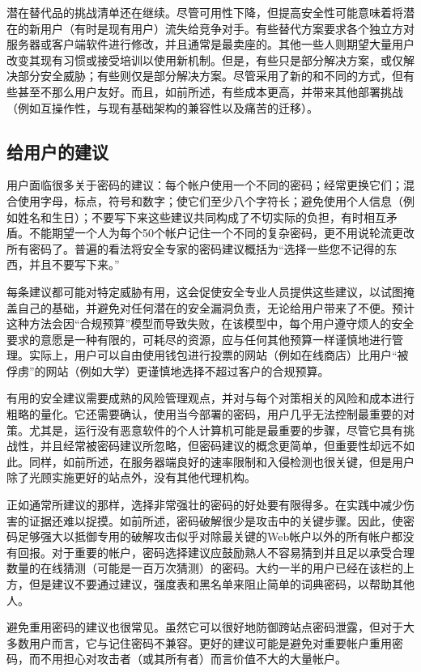 潜在替代品的挑战清单还在继续。尽管可用性下降，但提高安全性可能意味着将潜在的新用户（有时是现有用户）流失给竞争对手。有些替代方案要求各个独立方对服务器或客户端软件进行修改，并且通常是最卖座的。其他一些人则期望大量用户改变其现有习惯或接受培训以使用新机制。但是，有些只是部分解决方案，或仅解决部分安全威胁；有些则仅是部分解决方案。尽管采用了新的和不同的方式，但有些甚至不那么用户友好。而且，如前所述，有些成本更高，并带来其他部署挑战（例如互操作性，与现有基础架构的兼容性以及痛苦的迁移）。

\subsection{给用户的建议}

用户面临很多关于密码的建议：每个帐户使用一个不同的密码；经常更换它们；混合使用字母，标点，符号和数字；使它们至少八个字符长；避免使用个人信息（例如姓名和生日）；不要写下来这些建议共同构成了不切实际的负担，有时相互矛盾。不能期望一个人为每个50个帐户记住一个不同的复杂密码，更不用说轮流更改所有密码了。普遍的看法将安全专家的密码建议概括为“选择一些您不记得的东西，并且不要写下来。”

每条建议都可能对特定威胁有用，这会促使安全专业人员提供这些建议，以试图掩盖自己的基础，并避免对任何潜在的安全漏洞负责，无论给用户带来了不便。预计这种方法会因“合规预算”模型而导致失败，在该模型中，每个用户遵守烦人的安全要求的意愿是一种有限的，可耗尽的资源，应与任何其他预算一样谨慎地进行管理。实际上，用户可以自由使用钱包进行投票的网站（例如在线商店）比用户“被俘虏”的网站（例如大学）更谨慎地选择不超过客户的合规预算。

有用的安全建议需要成熟的风险管理观点，并对与每个对策相关的风险和成本进行粗略的量化。它还需要确认，使用当今部署的密码，用户几乎无法控制最重要的对策。尤其是，运行没有恶意软件的个人计算机可能是最重要的步骤，尽管它具有挑战性，并且经常被密码建议所忽略，但密码建议的概念更简单，但重要性却远不如此。同样，如前所述，在服务器端良好的速率限制和入侵检测也很关键，但是用户除了光顾实施更好的站点外，没有其他代理机构。

正如通常所建议的那样，选择非常强壮的密码的好处要有限得多。在实践中减少伤害的证据还难以捉摸。如前所述，密码破解很少是攻击中的关键步骤。因此，使密码足够强大以抵御专用的破解攻击似乎对除最关键的Web帐户以外的所有帐户都没有回报。对于重要的帐户，密码选择建议应鼓励熟人不容易猜到并且足以承受合理数量的在线猜测（可能是一百万次猜测）的密码。大约一半的用户已经在该栏的上方，但是建议不要通过建议，强度表和黑名单来阻止简单的词典密码，以帮助其他人。

避免重用密码的建议也很常见。虽然它可以很好地防御跨站点密码泄露，但对于大多数用户而言，它与记住密码不兼容。更好的建议可能是避免对重要帐户重用密码，而不用担心对攻击者（或其所有者）而言价值不大的大量帐户。

